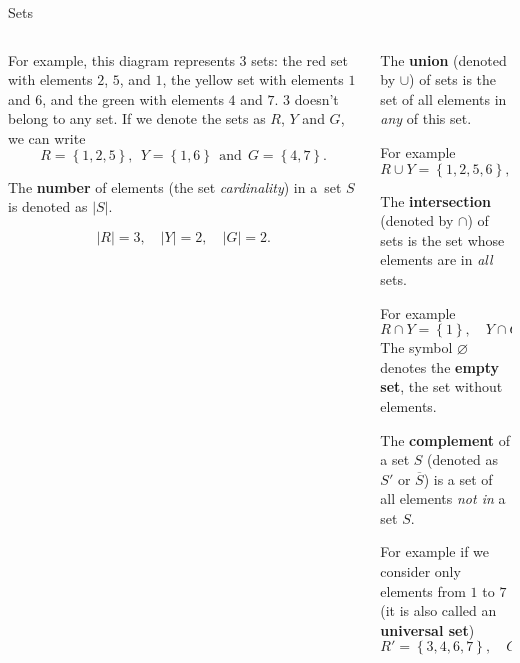 \documentclass[9pt,aspectratio=169]{beamer}
\begin{document}
\begin{frame}{Sets}
\begin{columns}[T]
\begin{column}{0.5\textwidth}
      For example, this diagram represents $3$ sets: the red set with elements $2$, $5$, and $1$, the yellow set with elements $1$ and $6$, and the green with elements $4$ and $7$. $3$ doesn't belong to any set. If we denote the sets as $R$, $Y$ and $G$, we can write
      \[ R = \left\{1, 2, 5\right\},\ \  Y = \left\{1, 6\right\}\ \ \text{and}\ \ G = \left\{4, 7\right\}. \]
      \vspace*{-0.9\baselineskip}
      \begin{definition}
        The \textbf{number} of elements (the set \emph{cardinality}) in a~set $S$ is denoted as $|S|$.
      \end{definition}
      \vspace*{-1\baselineskip}
      \[|R| = 3,\quad  |Y| = 2,\quad  |G| = 2.\]
    \end{column}
    \begin{column}{0.5\textwidth}
      \begin{definition}
        The \textbf{union} (denoted by $\cup$) of sets is the set of all elements in \emph{any} of this set.
      \end{definition}
      For example
      \[ R \cup Y = \left\{1, 2, 5, 6\right\},\quad  Y \cup G = \left\{1, 4, 6, 7\right\}. \]
      \vspace*{-0.9\baselineskip}
      \begin{definition}
        The \textbf{intersection} (denoted by $\cap$) of sets is the set whose elements are in \emph{all} sets.
      \end{definition}
      For example
      \[ R \cap Y = \left\{1\right\},\quad  Y \cap G = \left\{\ \right\} = \varnothing. \] 
      The symbol $\varnothing$ denotes the \textbf{empty set}, the set without elements.
      \begin{definition}
        \vspace*{-0.3em}
        The \textbf{complement} of a set $S$ (denoted as $S'$ or $\overline{S}$) is a set of all elements \emph{not in} a set $S$.
      \end{definition}
      For example if we consider only elements from $1$ to $7$ (it is also called an \textbf{universal set})
      \[ R′ = \left\{3, 4, 6, 7\right\},\quad  G′ = \left\{1, 2, 3, 5, 6\right\}. \]
    \end{column}
  \end{columns}
\end{frame}
\end{document}
